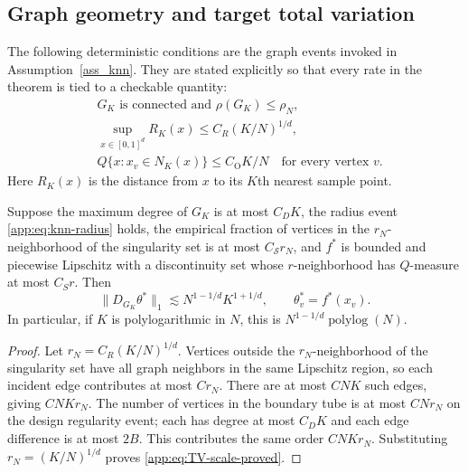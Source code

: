 \documentclass[twoside,11pt]{article}
\newenvironment{revision}{\color{revisionred}}{}
\begin{document}
\begin{revision}
\subsection{Graph geometry and target total variation}

The following deterministic conditions are the graph events invoked in
Assumption~\ref{ass_knn}.  They are stated explicitly so that every rate in the
theorem is tied to a checkable quantity:
\begin{align}
 &G_K\text{ is connected and }\rho(G_K)\le\rho_N,              \label{app:eq:graph-event-rho}\\
 &\sup_{x\in[0,1]^d}R_K(x)\le C_R(K/N)^{1/d},                  \label{app:eq:knn-radius}\\
 &Q\{x:x_v\in N_K(x)\}\le C_{\mathrm O}K/N\quad\text{for every vertex }v. \label{app:eq:overlap}
\end{align}
Here $R_K(x)$ is the distance from $x$ to its $K$th nearest sample point.

\begin{lemma}
\label{app:lem:graph-tv-scale}
Suppose the maximum degree of $G_K$ is at most $C_DK$, the radius event
\eqref{app:eq:knn-radius} holds, the empirical fraction of vertices in the $r_N$-neighborhood of the singularity set is at most $C_{\mathcal S}r_N$, and $f^*$ is bounded and piecewise Lipschitz
with a discontinuity set whose $r$-neighborhood has $Q$-measure at most $C_Sr$.
Then
\begin{equation}
 \|D_{G_K}\theta^*\|_1
 \lesssim N^{1-1/d}K^{1+1/d},
 \qquad \theta_v^*=f^*(x_v).                                  \label{app:eq:TV-scale-proved}
\end{equation}
In particular, if $K$ is polylogarithmic in $N$, this is
$N^{1-1/d}\operatorname{polylog}(N)$.
\end{lemma}

\begin{proof}
Let $r_N=C_R(K/N)^{1/d}$.  Vertices outside the $r_N$-neighborhood of the
singularity set have all graph neighbors in the same Lipschitz region, so each
incident edge contributes at most $C r_N$.  There are at most $C NK$ such
edges, giving $C NKr_N$.  The number of vertices in the boundary tube is at
most $C Nr_N$ on the design regularity event; each has degree at most $C_DK$
and each edge difference is at most $2B$.  This contributes the same order
$CNKr_N$.  Substituting $r_N=(K/N)^{1/d}$ proves
\eqref{app:eq:TV-scale-proved}.
\end{proof}


\end{revision}
\end{document}
